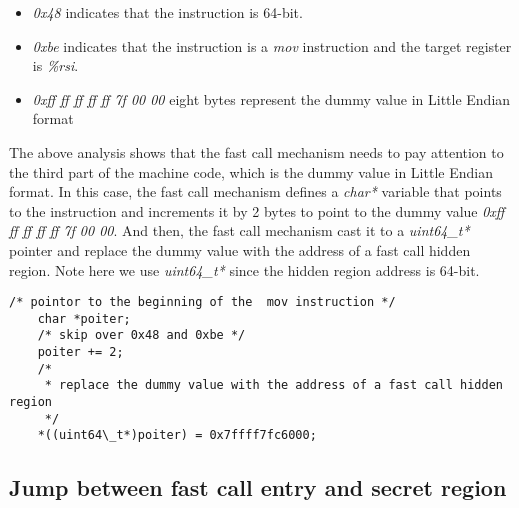   \begin{itemize}
    \item \emph{0x48} indicates that the instruction is 64-bit.
    \item \emph{0xbe} indicates that the instruction is a \emph{mov} instruction and the target register is \emph{\%rsi}.
    \item \emph{0xff ff ff ff ff 7f 00 00 } eight bytes represent the dummy value in Little Endian format
  \end{itemize}
  
  The above analysis shows that the fast call mechanism needs to pay attention to 
  the third part of the machine code, which is the dummy value in Little Endian 
  format\cite{15}. In this case, the fast call mechanism defines a \emph{char*} variable that 
  points to the instruction and increments it by 2 bytes to point to the 
  dummy value \emph{0xff ff ff ff ff 7f 00 00}. And then, the fast call mechanism cast it to a \emph{uint64\_t*}
  pointer and replace the dummy value with the address of a fast call hidden 
  region. Note here we use \emph{uint64\_t*} since the hidden region address is 64-bit.

  \begin{lstlisting}[style=CStyle]
    /* pointor to the beginning of the  mov instruction */ 
    char *poiter;
    /* skip over 0x48 and 0xbe */ 
    poiter += 2; 
    /* 
     * replace the dummy value with the address of a fast call hidden region 
     */  
    *((uint64\_t*)poiter) = 0x7ffff7fc6000; 
  \end{lstlisting}


\subsection{Jump between fast call entry and secret region}

